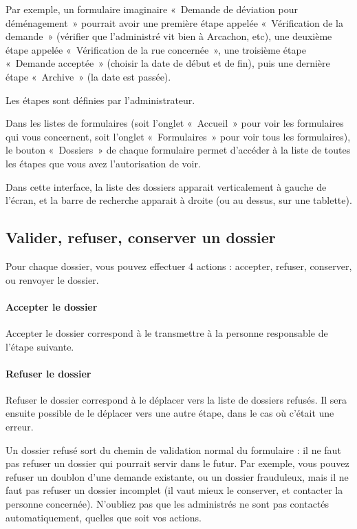 \documentclass[11pt,french]{memoir}
\begin{document}
	Par exemple, un formulaire imaginaire «~Demande de déviation pour déménagement~» pourrait avoir une première étape appelée «~Vérification de la demande~» (vérifier que l'administré vit bien à Arcachon, etc), une deuxième étape appelée «~Vérification de la rue concernée~», une troisième étape «~Demande acceptée~» (choisir la date de début et de fin), puis une dernière étape «~Archive~» (la date est passée).

	Les étapes sont définies par l'administrateur.

	\uparagraph
	Dans les listes de formulaires (soit l'onglet «~Accueil~» pour voir les formulaires qui vous concernent, soit l'onglet «~Formulaires~» pour voir tous les formulaires), le bouton «~Dossiers~» de chaque formulaire permet d'accéder à la liste de toutes les étapes que vous avez l'autorisation de voir.

	Dans cette interface, la liste des dossiers apparait verticalement à gauche de l'écran, et la barre de recherche apparait à droite (ou au dessus, sur une tablette).

	\subsection{Valider, refuser, conserver un dossier}\label{subsec:valider-refuser-garder-un-dossier}

	Pour chaque dossier, vous pouvez effectuer 4 actions : accepter, refuser, conserver, ou renvoyer le dossier.

	\paragraph{Accepter le dossier}
	Accepter le dossier correspond à le transmettre à la personne responsable de l'étape suivante.

	\paragraph{Refuser le dossier}
	Refuser le dossier correspond à le déplacer vers la liste de dossiers refusés.
	Il sera ensuite possible de le déplacer vers une autre étape, dans le cas où c'était une erreur.

	Un dossier refusé sort du chemin de validation normal du formulaire : il ne faut pas refuser un dossier qui pourrait servir dans le futur.
	Par exemple, vous pouvez refuser un doublon d'une demande existante, ou un dossier frauduleux, mais il ne faut pas refuser un dossier incomplet (il vaut mieux le conserver, et contacter la personne concernée).
	N'oubliez pas que les administrés ne sont pas contactés automatiquement, quelles que soit vos actions.
\end{document}
